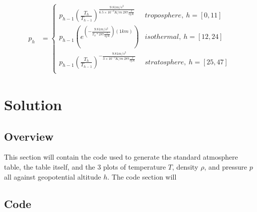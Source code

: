 \documentclass{article}
\begin{document}
\begin{align}
    p_h &= \begin{cases}
    p_{h-1}{\left(\frac{T_h}{T_{h-1}}\right)}^{\frac{9.81 m/s^2}{6.5\times10^{-3}K/m\ 287 \frac{J}{kg\ K}}}    & troposphere,\ h = [0,11] \\
    p_{h-1}\left(e^{\left(- \frac{9.81 m/s^2}{T_h * 287 \frac{J}{kg\ K} }\right)\left(1 km\right)}\right)                                          & isothermal,\ h = [12,24] \\
    p_{h-1}{\left(\frac{T_h}{T_{h-1}}\right)}^{-\frac{9.81 m/s^2}{3\times10^{-3}K/m\ 287 \frac{J}{kg\ K}}}       & stratosphere,\ h = [25,47] \\
    \end{cases}
\end{align}


\section{Solution}

\subsection{Overview}

This section will contain the code used to generate the standard atmosphere table, the table itself, and the 3 plots of temperature $T$, density $\rho$, and pressure $p$ all against geopotential altitude $h$. The code section will 

\subsection{Code}
\end{document}
